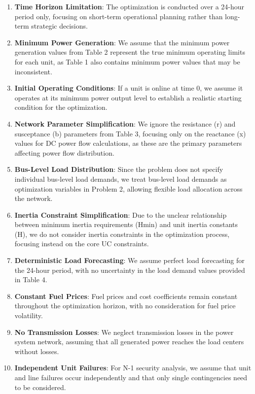 \documentclass{apmcmthesis}
\begin{document}
\begin{enumerate}
\item \textbf{Time Horizon Limitation}: The optimization is conducted over a 24-hour period only, focusing on short-term operational planning rather than long-term strategic decisions.

\item \textbf{Minimum Power Generation}: We assume that the minimum power generation values from Table 2 represent the true minimum operating limits for each unit, as Table 1 also contains minimum power values that may be inconsistent.

\item \textbf{Initial Operating Conditions}: If a unit is online at time 0, we assume it operates at its minimum power output level to establish a realistic starting condition for the optimization.

\item \textbf{Network Parameter Simplification}: We ignore the resistance (r) and susceptance (b) parameters from Table 3, focusing only on the reactance (x) values for DC power flow calculations, as these are the primary parameters affecting power flow distribution.

\item \textbf{Bus-Level Load Distribution}: Since the problem does not specify individual bus-level load demands, we treat bus-level load demands as optimization variables in Problem 2, allowing flexible load allocation across the network.

\item \textbf{Inertia Constraint Simplification}: Due to the unclear relationship between minimum inertia requirements (Hmin) and unit inertia constants (H), we do not consider inertia constraints in the optimization process, focusing instead on the core UC constraints.

\item \textbf{Deterministic Load Forecasting}: We assume perfect load forecasting for the 24-hour period, with no uncertainty in the load demand values provided in Table 4.

\item \textbf{Constant Fuel Prices}: Fuel prices and cost coefficients remain constant throughout the optimization horizon, with no consideration for fuel price volatility.

\item \textbf{No Transmission Losses}: We neglect transmission losses in the power system network, assuming that all generated power reaches the load centers without losses.

\item \textbf{Independent Unit Failures}: For N-1 security analysis, we assume that unit and line failures occur independently and that only single contingencies need to be considered.
\end{enumerate}
\end{document}
